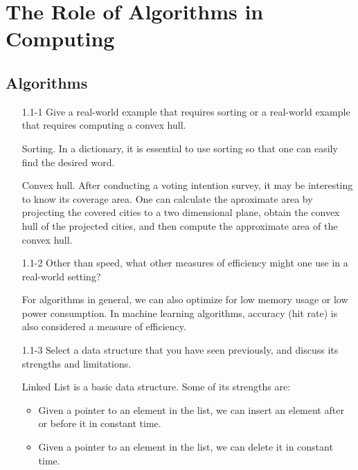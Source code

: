 \chapter{The Role of Algorithms in Computing}

\section{Algorithms}

\begin{enumerate}

\item[1.1{-}1] Give a real-world example that requires sorting or
  a real-world example that requires computing a convex hull.

\begin{framed}
Sorting. In a dictionary, it is essential to use sorting so that one
can easily find the desired word.

Convex hull. After conducting a voting intention survey, it may be
interesting to know its coverage area. One can calculate the aproximate area by
projecting the covered cities to a two dimensional plane, obtain the convex hull
of the projected cities, and then compute the approximate area of the convex
hull.
\end{framed}

\item[1.1{-}2] Other than speed, what other measures of efficiency might
  one use in a real-world setting?

\begin{framed}
For algorithms in general, we can also optimize for low memory usage or low
power consumption. In machine learning algorithms, accuracy (hit rate) is also
considered a measure of efficiency.
\end{framed}

\item[1.1{-}3] Select a data structure that you have seen previously,
  and discuss its strengths and limitations.

\begin{framed}
Linked List is a basic data structure. Some of its strengths are:

\begin{itemize}
\item Given a pointer to an element in the list, we can insert an element after
  or before it in constant time.
\item Given a pointer to an element in the list, we can delete it in constant
  time.
\end{itemize}


\end{framed}
\end{enumerate}
